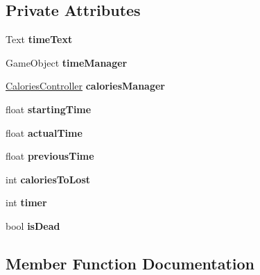 \subsection*{Private Attributes}
\begin{DoxyCompactItemize}
\item 
\mbox{\label{class_time_controller_a99ffaa5295e9966eb3d4193148ee1872}} 
Text {\bfseries time\+Text}
\item 
\mbox{\label{class_time_controller_a4b06f18491704904152df8892910d680}} 
Game\+Object {\bfseries time\+Manager}
\item 
\mbox{\label{class_time_controller_a2c9c8d4fa6064e169097ad6cd9496c10}} 
\mbox{\hyperlink{class_calories_controller}{Calories\+Controller}} {\bfseries calories\+Manager}
\item 
\mbox{\label{class_time_controller_a99b6cdfa30d893add2a079c64263c514}} 
float {\bfseries starting\+Time}
\item 
\mbox{\label{class_time_controller_a15c1438cde26d29ca344d41c2025344a}} 
float {\bfseries actual\+Time}
\item 
\mbox{\label{class_time_controller_aa3cc16bfa3a109262d9d6dbeff8d35e1}} 
float {\bfseries previous\+Time}
\item 
\mbox{\label{class_time_controller_ab376a3d495666e554f2d1159d2dadca9}} 
int {\bfseries calories\+To\+Lost}
\item 
\mbox{\label{class_time_controller_a72662f634bd87b08684e500f4a1cd987}} 
int {\bfseries timer}
\item 
\mbox{\label{class_time_controller_a32d6967178527c2f0061a616f367ff22}} 
bool {\bfseries is\+Dead}
\end{DoxyCompactItemize}


\subsection{Member Function Documentation}
\mbox{\label{class_time_controller_aa4f1e53477ee98721d237e6e1136ff0d}} 
